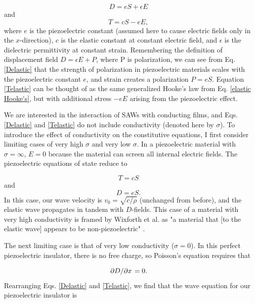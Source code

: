 \documentclass[double,12pt,1in]{beavtex}
\begin{document}
\begin{equation} 
    D = eS + \epsilon E \label{Delastic}
\end{equation}
and
\begin{equation} 
    T = cS -eE, \label{Telastic}
\end{equation}
where $e$ is the piezoelectric constant (assumed here to cause electric fields only in the $x$-direction), $c$ is the elastic constant at constant electric field, and $\epsilon$ is the dielectric permittivity at constant strain. Remembering the definition of displacement field $D = \epsilon E + P$, where P is polarization, we can see from Eq. \ref{Delastic} that the strength of polarization in piezoelectric materials scales with the piezoelectric constant $e$, and strain creates a polarization $P = eS$. Equation \ref{Telastic} can be thought of as the same generalized Hooke's law from Eq. \ref{elastic Hooke's}, but with additional stress $-eE$ arising from the piezoelectric effect. 

We are interested in the interaction of SAWs with conducting films, and Eqs. \ref{Delastic} and \ref{Telastic} do not include conductivity (denoted here by $\sigma$). To introduce the effect of conductivity on the constitutive equations, I first consider limiting cases of very high $\sigma$ and very low $\sigma$. In a piezoelectric material with $\sigma = \infty$, $E = 0$ because the material can screen all internal electric fields. The piezoelectric equations of state reduce to 

\begin{equation}
    T = cS
\end{equation}
and
\begin{equation}
    D = eS.
\end{equation}
In this case, our wave velocity is $v_0 = \sqrt{c/\rho}$ (unchanged from before), and the elastic wave propagates in tandem with $D$-fields. This case of a material with very high conductivity is framed by Wixforth et al.  as "a material that [to the elastic wave] appears to be non-piezoelectric" \cite{wixforth_surface_1989}.

The next limiting case is that of very low conductivity ($\sigma = 0$). In this perfect piezoelectric insulator, there is no free charge, so Poisson's equation requires that 

\begin{equation}
    \pdv*{D}{x} = 0.
\end{equation}
Rearranging Eqs. \ref{Delastic} and \ref{Telastic}, we find that the wave equation for our piezoelectric insulator is
\end{document}
